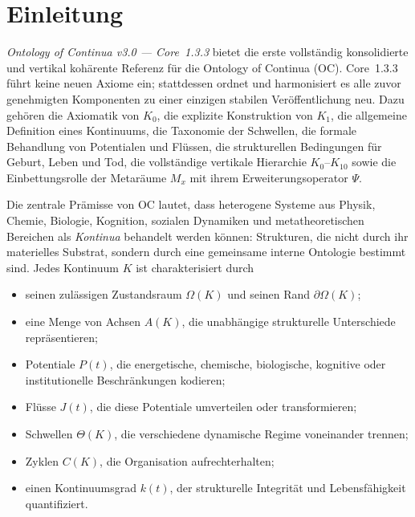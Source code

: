 
\section{Einleitung}
\label{sec:intro}

\emph{Ontology of Continua v3.0 — Core~1.3.3} bietet die erste vollständig konsolidierte und vertikal kohärente Referenz für die Ontology of Continua (OC). Core~1.3.3 führt keine neuen Axiome ein; stattdessen ordnet und harmonisiert es alle zuvor genehmigten Komponenten zu einer einzigen stabilen Veröffentlichung neu. Dazu gehören die Axiomatik von \(K_0\), die explizite Konstruktion von \(K_1\), die allgemeine Definition eines Kontinuums, die Taxonomie der Schwellen, die formale Behandlung von Potentialen und Flüssen, die strukturellen Bedingungen für Geburt, Leben und Tod, die vollständige vertikale Hierarchie \(K_0\)–\(K_{10}\) sowie die Einbettungsrolle der Metaräume \(M_x\) mit ihrem Erweiterungsoperator \(\Psi\).

Die zentrale Prämisse von OC lautet, dass heterogene Systeme aus Physik, Chemie, Biologie, Kognition, sozialen Dynamiken und metatheoretischen Bereichen als \emph{Kontinua} behandelt werden können: Strukturen, die nicht durch ihr materielles Substrat, sondern durch eine gemeinsame interne Ontologie bestimmt sind. Jedes Kontinuum \(K\) ist charakterisiert durch

\begin{itemize}
    \item seinen zulässigen Zustandsraum \(\Omega(K)\) und seinen Rand \(\partial\Omega(K)\);
    \item eine Menge von Achsen \(A(K)\), die unabhängige strukturelle Unterschiede repräsentieren;
    \item Potentiale \(P(t)\), die energetische, chemische, biologische, kognitive oder institutionelle Beschränkungen kodieren;
    \item Flüsse \(J(t)\), die diese Potentiale umverteilen oder transformieren;
    \item Schwellen \(\Theta(K)\), die verschiedene dynamische Regime voneinander trennen;
    \item Zyklen \(C(K)\), die Organisation aufrechterhalten;
    \item einen Kontinuumsgrad \(k(t)\), der strukturelle Integrität und Lebensfähigkeit quantifiziert.
\end{itemize}

